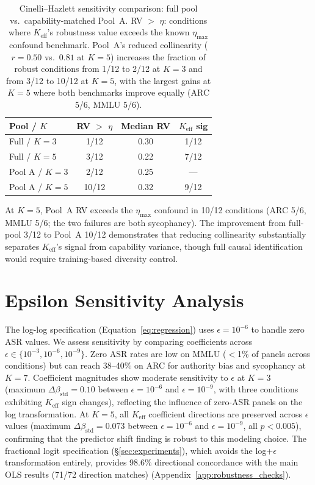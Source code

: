 \begin{table}[h]
\centering
\small
\begin{tabular}{lccc}
\toprule
\textbf{Pool / $K$} & \textbf{RV $>$ $\eta$} & \textbf{Median RV} & \textbf{$K_{\mathrm{eff}}$ sig} \\
\midrule
Full / $K{=}3$ & 1/12 & 0.30 & 1/12 \\
Full / $K{=}5$ & 3/12 & 0.22 & 7/12 \\
Pool A / $K{=}3$ & 2/12 & 0.25 & --- \\
Pool A / $K{=}5$ & 10/12 & 0.32 & 9/12 \\
\bottomrule
\end{tabular}
\caption{Cinelli--Hazlett sensitivity comparison: full pool vs.\ capability-matched Pool~A. RV $>$ $\eta$: conditions where $K_{\mathrm{eff}}$'s robustness value exceeds the known $\eta_{\max}$ confound benchmark. Pool~A's reduced collinearity ($r{=}0.50$ vs.\ $0.81$ at $K{=}5$) increases the fraction of robust conditions from 1/12 to 2/12 at $K{=}3$ and from 3/12 to 10/12 at $K{=}5$, with the largest gains at $K{=}5$ where both benchmarks improve equally (ARC 5/6, MMLU 5/6).}
\label{tab:sensitivity_poolA}
\end{table}

At $K{=}5$, Pool~A RV exceeds the $\eta_{\max}$ confound in 10/12 conditions (ARC 5/6, MMLU 5/6; the two failures are both sycophancy). The improvement from full-pool 3/12 to Pool~A 10/12 demonstrates that reducing collinearity substantially separates $K_{\mathrm{eff}}$'s signal from capability variance, though full causal identification would require training-based diversity control.

\section{Epsilon Sensitivity Analysis}
\label{app:epsilon}

The log-log specification (Equation~\ref{eq:regression}) uses $\epsilon{=}10^{-6}$ to handle zero ASR values. We assess sensitivity by comparing coefficients across $\epsilon \in \{10^{-3}, 10^{-6}, 10^{-9}\}$. Zero ASR rates are low on MMLU ($<$1\% of panels across conditions) but can reach 38--40\% on ARC for authority bias and sycophancy at $K{=}7$. Coefficient magnitudes show moderate sensitivity to $\epsilon$ at $K{=}3$ (maximum $\Delta\beta_{\mathrm{std}} = 0.10$ between $\epsilon{=}10^{-6}$ and $\epsilon{=}10^{-9}$, with three conditions exhibiting $K_{\mathrm{eff}}$ sign changes), reflecting the influence of zero-ASR panels on the log transformation. At $K{=}5$, all $K_{\mathrm{eff}}$ coefficient directions are preserved across $\epsilon$ values (maximum $\Delta\beta_{\mathrm{std}} = 0.073$ between $\epsilon{=}10^{-6}$ and $\epsilon{=}10^{-9}$, all $p < 0.005$), confirming that the predictor shift finding is robust to this modeling choice. The fractional logit specification (\S\ref{sec:experiments}), which avoids the log+$\epsilon$ transformation entirely, provides 98.6\% directional concordance with the main OLS results (71/72 direction matches) (Appendix~\ref{app:robustness_checks}).

